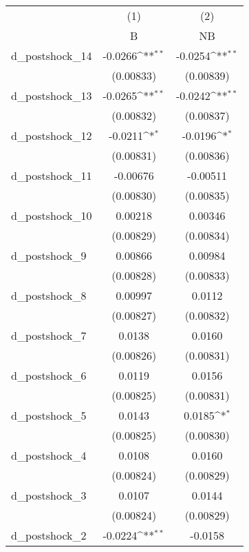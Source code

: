 {
\def\sym#1{\ifmmode^{#1}\else\(^{#1}\)\fi}
\begin{tabular}{l*{2}{c}}
\hline\hline
          &\multicolumn{1}{c}{(1)}&\multicolumn{1}{c}{(2)}\\
          &\multicolumn{1}{c}{B}&\multicolumn{1}{c}{NB}\\
\hline
d\_postshock\_14&  -0.0266\sym{**} &  -0.0254\sym{**} \\
          &(0.00833)         &(0.00839)         \\
d\_postshock\_13&  -0.0265\sym{**} &  -0.0242\sym{**} \\
          &(0.00832)         &(0.00837)         \\
d\_postshock\_12&  -0.0211\sym{*}  &  -0.0196\sym{*}  \\
          &(0.00831)         &(0.00836)         \\
d\_postshock\_11& -0.00676         & -0.00511         \\
          &(0.00830)         &(0.00835)         \\
d\_postshock\_10&  0.00218         &  0.00346         \\
          &(0.00829)         &(0.00834)         \\
d\_postshock\_9&  0.00866         &  0.00984         \\
          &(0.00828)         &(0.00833)         \\
d\_postshock\_8&  0.00997         &   0.0112         \\
          &(0.00827)         &(0.00832)         \\
d\_postshock\_7&   0.0138         &   0.0160         \\
          &(0.00826)         &(0.00831)         \\
d\_postshock\_6&   0.0119         &   0.0156         \\
          &(0.00825)         &(0.00831)         \\
d\_postshock\_5&   0.0143         &   0.0185\sym{*}  \\
          &(0.00825)         &(0.00830)         \\
d\_postshock\_4&   0.0108         &   0.0160         \\
          &(0.00824)         &(0.00829)         \\
d\_postshock\_3&   0.0107         &   0.0144         \\
          &(0.00824)         &(0.00829)         \\
d\_postshock\_2&  -0.0224\sym{**} &  -0.0158         \\

\end{tabular}}
